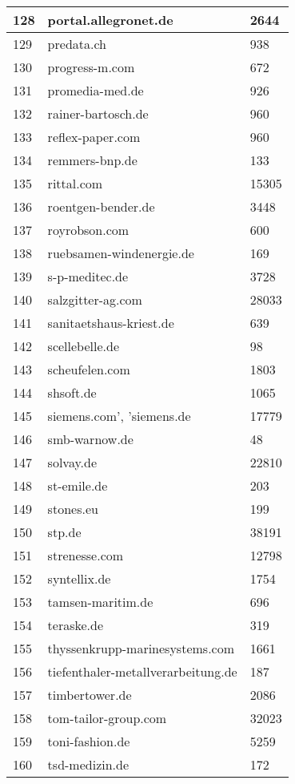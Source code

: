 \begin{longtable}{|m{0.5cm}||m{8cm}|m{5cm}|}
	\hline
	128 & portal.allegronet.de & 2644\\
	\hline
	129 & predata.ch & 938\\
	\hline
	130 & progress-m.com & 672\\
	\hline
	131 & promedia-med.de & 926\\
	\hline
	132 & rainer-bartosch.de & 960\\
	\hline
	133 & reflex-paper.com & 960\\
	\hline
	134 & remmers-bnp.de & 133\\
	\hline
	135 & rittal.com & 15305\\
	\hline
	136 & roentgen-bender.de & 3448\\
	\hline
	137 & royrobson.com & 600\\
	\hline
	138 & ruebsamen-windenergie.de & 169\\
	\hline
	139 & s-p-meditec.de & 3728\\
	\hline
	140 & salzgitter-ag.com & 28033\\
	\hline
	141 & sanitaetshaus-kriest.de & 639\\
	\hline
	142 & scellebelle.de & 98\\
	\hline
	143 & scheufelen.com & 1803\\
	\hline
	144 & shsoft.de & 1065\\
	\hline
	145 & siemens.com', 'siemens.de & 17779\\
	\hline
	146 & smb-warnow.de & 48\\
	\hline
	147 & solvay.de & 22810\\
	\hline
	148 & st-emile.de & 203\\
	\hline
	149 & stones.eu & 199\\
	\hline
	150 & stp.de & 38191\\
	\hline
	151 & strenesse.com & 12798\\
	\hline
	152 & syntellix.de & 1754\\
	\hline
	153 & tamsen-maritim.de & 696\\
	\hline
	154 & teraske.de & 319\\
	\hline
	155 & thyssenkrupp-marinesystems.com & 1661\\
	\hline
	156 & tiefenthaler-metallverarbeitung.de & 187\\
	\hline
	157 & timbertower.de & 2086\\
	\hline
	158 & tom-tailor-group.com & 32023\\
	\hline
	159 & toni-fashion.de & 5259\\
	\hline
	160 & tsd-medizin.de & 172\\

\end{longtable}
